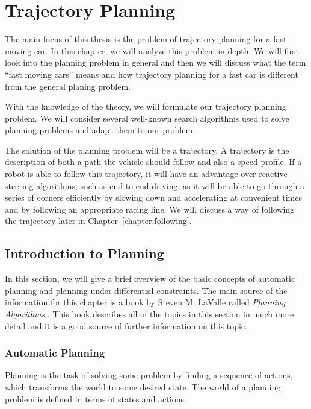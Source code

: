 \chapter{Trajectory Planning}

The main focus of this thesis is the problem of trajectory planning for a fast moving car. In this chapter, we will analyze this problem in depth. We will first look into the planning problem in general and then we will discuss what the term ``fast moving cars'' means and how trajectory planning for a fast car is different from the general planing problem.

With the knowledge of the theory, we will formulate our trajectory planning problem. We will consider several well-known search algorithms used to solve planning problems and adapt them to our problem.

The solution of the planning problem will be a trajectory. A trajectory is the description of both a path the vehicle should follow and also a speed profile. If a robot is able to follow this trajectory, it will have an advantage over reactive steering algorithms, such as end-to-end driving, as it will be able to go through a series of corners efficiently by slowing down and accelerating at convenient times and by following an appropriate racing line. We will discuss a way of following the trajectory later in Chapter~\ref{chapter:following}.

\section{Introduction to Planning}

In this section, we will give a brief overview of the basic concepts of automatic planning and planning under differential constraints. The main source of the information for this chapter is a book by Steven M. LaValle called \textit{Planning Algorithms} \cite{lavalle_2006}. This book describes all of the topics in this section in much more detail and it is a good source of further information on this topic.

\subsection{Automatic Planning}

Planning is the task of solving some problem by finding a sequence of actions, which transforms the world to some desired state. The world of a planning problem is defined in terms of states and actions.

